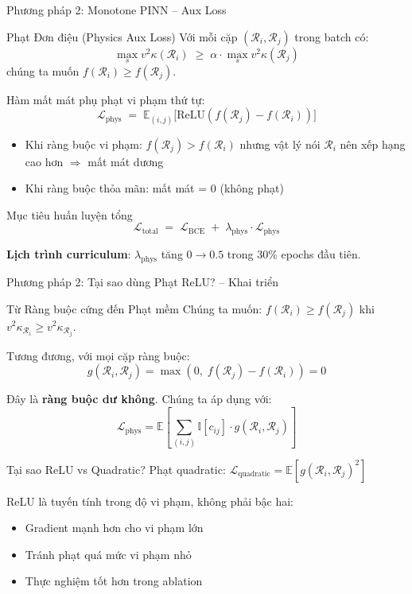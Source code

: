 \documentclass[aspectratio=169,10pt]{beamer}
\begin{document}
\begin{frame}{Phương pháp 2: Monotone PINN -- Aux Loss}
\begin{block}{Phạt Đơn điệu (Physics Aux Loss)}
\scriptsize
Với mỗi cặp $(\mathcal{R}_i, \mathcal{R}_j)$ trong batch có:
\[
\max_s v^2\kappa(\mathcal{R}_i) \;\ge\; \alpha \cdot \max_s v^2\kappa(\mathcal{R}_j)
\]
chúng ta muốn $f(\mathcal{R}_i) \ge f(\mathcal{R}_j)$.

Hàm mất mát phụ phạt vi phạm thứ tự:
\[
\boxed{\mathcal{L}_{\text{phys}} \;=\; \mathbb{E}_{(i,j)} \big[ \mathrm{ReLU}(f(\mathcal{R}_j) - f(\mathcal{R}_i)) \big]}
\]

\begin{itemize}
  \item Khi ràng buộc vi phạm: $f(\mathcal{R}_j) > f(\mathcal{R}_i)$ nhưng vật lý nói $\mathcal{R}_i$ nên xếp hạng cao hơn $\Rightarrow$ mất mát dương
  \item Khi ràng buộc thỏa mãn: mất mát = 0 (không phạt)
\end{itemize}
\end{block}

\begin{block}{Mục tiêu huấn luyện tổng}
\scriptsize
\[
\boxed{\mathcal{L}_{\text{total}} \;=\; \mathcal{L}_{\text{BCE}} \;+\; \lambda_{\text{phys}} \cdot \mathcal{L}_{\text{phys}}}
\]

\textbf{Lịch trình curriculum}: $\lambda_{\text{phys}}$ tăng $0 \to 0.5$ trong 30\% epochs đầu tiên.
\end{block}
\end{frame}

\begin{frame}{Phương pháp 2: Tại sao dùng Phạt ReLU? -- Khai triển}
\begin{block}{Từ Ràng buộc cứng đến Phạt mềm}
\scriptsize
Chúng ta muốn: $f(\mathcal{R}_i) \ge f(\mathcal{R}_j)$ khi $v^2\kappa_{\mathcal{R}_i} \ge v^2\kappa_{\mathcal{R}_j}$.

Tương đương, với mọi cặp ràng buộc:
\[
g(\mathcal{R}_i, \mathcal{R}_j) = \max(0,\; f(\mathcal{R}_j) - f(\mathcal{R}_i)) = 0
\]

Đây là \textbf{ràng buộc dư không}. Chúng ta áp dụng với:
\[
\mathcal{L}_{\text{phys}} = \mathbb{E}\left[\sum_{(i,j)} \mathbb{I}[c_{ij}] \cdot g(\mathcal{R}_i, \mathcal{R}_j)\right]
\]
\end{block}

\vspace{0.3em}

\begin{block}{Tại sao ReLU vs Quadratic?}
\scriptsize
Phạt quadratic: $\mathcal{L}_{\text{quadratic}} = \mathbb{E}[g(\mathcal{R}_i, \mathcal{R}_j)^2]$

ReLU là \alert{tuyến tính trong độ vi phạm}, không phải bậc hai:
\begin{itemize}\setlength\itemsep{0.2em}
  \item Gradient mạnh hơn cho vi phạm lớn
  \item Tránh phạt quá mức vi phạm nhỏ
  \item Thực nghiệm tốt hơn trong ablation
\end{itemize}
\end{block}
\end{frame}
\end{document}
